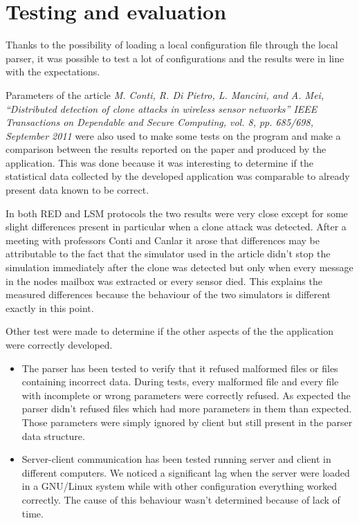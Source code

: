 \section{Testing and evaluation}
Thanks to the possibility of loading a local configuration file through the
local parser, it was possible to test a lot of configurations and the
results were in line with the expectations.

Parameters of the article \textit{M. Conti, R. Di Pietro, L. Mancini, and A. Mei,
``Distributed detection of clone attacks in wireless sensor networks'' IEEE 
Transactions on Dependable and Secure Computing, vol. 8, pp. 685/698,
September 2011} were also used to make some tests on the program and make a
comparison between the results reported on the paper and produced by the
application. This was done because it was interesting to determine if the 
statistical data collected by the developed application was comparable to
already present data known to be correct. 

In both RED and LSM protocols the two results were very close except for some
slight differences present in particular when a clone attack was detected.
After a meeting with professors Conti and Canlar it arose that differences may
be attributable to the fact that the simulator used in the article didn't stop
the simulation immediately after the clone was detected but only when every 
message in the nodes mailbox was extracted or every sensor died. This explains
the measured differences because the behaviour of the two simulators is 
different exactly in this point.

Other test were made to determine if the other aspects of the the application
were correctly developed.
\begin{itemize}
  \item The parser has been tested to verify that it refused malformed files or 
  files containing incorrect data. During tests, every malformed file and 
  every file with incomplete or wrong parameters were correctly refused. 
  As expected the parser didn't refused files which had more parameters in them
  than expected. Those parameters were simply ignored by client but still 
  present in the parser data structure.
  \item Server-client communication has been tested running server and client in
  different computers. We noticed a significant lag when the server were loaded
  in a GNU/Linux system while with other configuration everything worked 
  correctly. The cause of this behaviour wasn't determined because of lack of 
  time.
\end{itemize}

